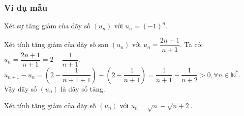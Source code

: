 \subsubsection{Ví dụ mẫu}
\begin{vd}[NB]%
	Xét sự tăng giảm của dãy số $(u_n)$ với $u_n=(-1)^n$.
\end{vd}
\begin{vd}[NB]%
	Xét tính tăng giảm của dãy số sau $(u_n)$ với $u_n=\dfrac{2n+1}{n+1}$.
	\loigiai
	{
		Ta có: $u_n=\dfrac{2n+1}{n+1}=2-\dfrac{1}{n+1}$.\\
		$u_{n+1}-u_n=\left(2-\dfrac{1}{n+1+1}\right)-\left(2-\dfrac{1}{n+1}\right)=\dfrac{1}{n+1}-\dfrac{1}{n+2}>0, \forall n \in \mathbb{N}^\ast$.\\
		Vậy dãy số $(u_n)$ là dãy số tăng.
	}
\end{vd}
\begin{vd}[TH]%
	Xét tính tăng giảm của dãy số $(u_n)$ với $u_n=\sqrt{n}-\sqrt{n+2}$.
\end{vd}


